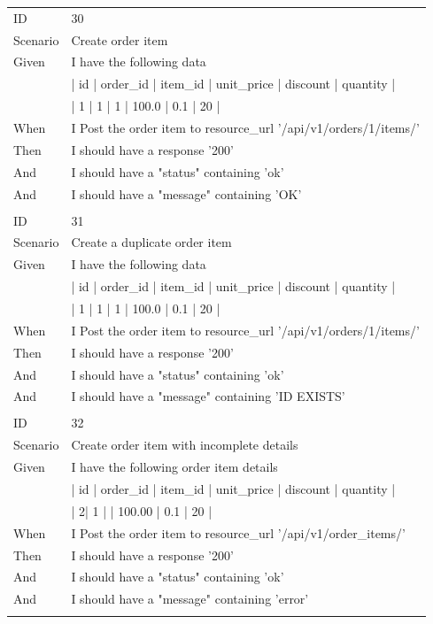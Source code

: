 \documentclass{report}
\begin{document}
\begin{tabular}{ l l }
ID 			& 30\\
Scenario		& Create order item \\
Given 		& I have the following data \\
	    		& | id | order\_id | item\_id | unit\_price | discount | quantity | \\
    			& | 1  | 1        | 1          | 100.0      | 0.1      | 20       |\\
When 		& I Post the order item to resource\_url  '/api/v1/orders/1/items/' \\
Then 		& I should have a response '200' \\
And 			& I should have a "status" containing 'ok' \\
And 			& I should have a "message" containing 'OK' \\ \\
ID 			& 31\\
Scenario		& Create a duplicate order item \\
Given 		& I have the following data \\ 
     		& | id | order\_id | item\_id | unit\_price | discount | quantity | \\
     		& | 1  | 1        | 1          | 100.0      | 0.1      | 20       |\\
When 		& I Post the order item to resource\_url  '/api/v1/orders/1/items/' \\
Then 		& I should have a response '200' \\
And 			& I should have a "status" containing 'ok' \\
And 			& I should have a "message" containing 'ID EXISTS' \\ \\
ID 			& 32\\
Scenario		& Create order item with incomplete details \\
Given 		& I have the following order item details \\
     		& | id | order\_id | item\_id | unit\_price | discount | quantity | \\
     		& | 2| 1 | | 100.00 | 0.1      | 20       | \\
When 		& I Post the order item to resource\_url  '/api/v1/order\_items/' \\
Then 		& I should have a response '200' \\
And 			& I should have a "status" containing 'ok' \\
And 			& I should have a "message" containing 'error'\\ \\

\end{tabular}
\end{document}
